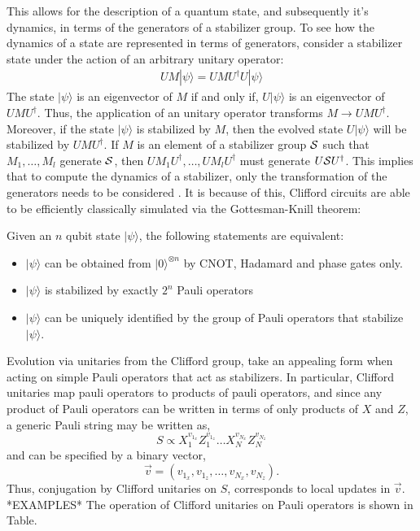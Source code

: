 This allows for the description of a quantum state, and subsequently it's dynamics, in terms of the generators
of a stabilizer group. To see how the dynamics of a state are represented in terms of generators, consider
a stabilizer state under the action of an arbitrary unitary operator:
\begin{align}
    UM|\psi \rangle =  UMU^{\dagger}U|\psi\rangle
\end{align}
The state $|\psi \rangle$ is an eigenvector of $M$ if and only if, $U |\psi\rangle$ is an
eigenvector of $UMU^{\dagger}$. Thus, the application of an unitary operator transforms
$M \to UMU^{\dagger}$. Moreover, if the state $|\psi \rangle$ is stabilized by $M$, then the evolved
state $U|\psi\rangle$ will be stabilized by $UMU^{\dagger}$. If $M$ is an element of a stabilizer group
$\cal S$ such that $M_1, \dots, M_l$ generate $\cal S$, then $UM_1U^{\dagger}, \dots, UM_lU^{\dagger}$ must generate
$U{\cal S}U^{\dagger}$. This implies that to compute the dynamics of a stabilizer, only the transformation of
the generators needs to be considered \cite{fault-tolerantQC}. It is because of this,
Clifford circuits are able to be efficiently classically simulated via the Gottesman-Knill theorem:
\begin{theorem}

    Given an $n$ qubit state $|\psi \rangle$, the following statements are equivalent:
    \begin{itemize}
        \item $|\psi \rangle$ can be obtained from $|0 \rangle^{\otimes n}$ by CNOT, Hadamard and phase gates only.
        \item $|\psi \rangle$ is stabilized by exactly $2^n$ Pauli operators
        \item $|\psi \rangle$ can be uniquely identified by the group of Pauli operators that
              stabilize $|\psi \rangle$.
    \end{itemize}
\end{theorem}
Evolution via unitaries from the Clifford group, take an appealing form when acting on simple Pauli operators that act as stabilizers.
In particular, Clifford unitaries map pauli operators to products of pauli operators, and since any product of Pauli operators
can be written in terms of only products of $X$ and $Z$, a generic Pauli string may be written as,
\begin{equation}
    S \propto X_1^{v_{1_x}}Z^{v_{1_z}}_1 \dots X_N^{v_{N_x}}Z^{v_{N_z}}_N
\end{equation}
and can be specified by a binary vector,
\begin{equation}
    \vec{v} = (v_{1_x},  v_{1_z}, \dots, v_{N_x}, v_{N_z}).
\end{equation}
Thus, conjugation by Clifford unitaries on $S$, corresponds to local updates in $\vec{v}$.
*EXAMPLES*
The operation of Clifford unitaries on Pauli operators is shown in Table.

